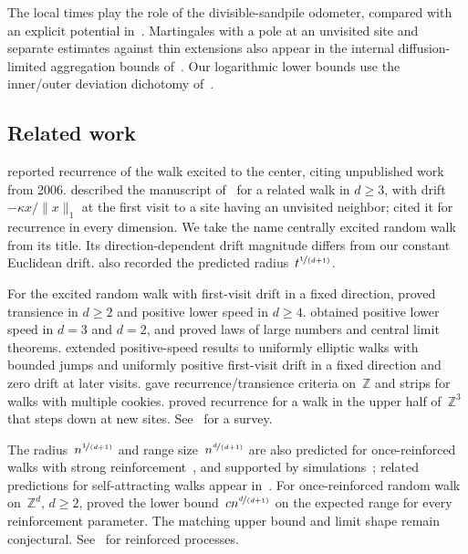 \documentclass[11pt]{amsart}
\theoremstyle{plain}
\theoremstyle{definition}
\newcommand{\Z}{\mathbb Z}
\newcommand{\drift}{\kappa}
\newcommand{\nf}{\nicefrac}
\numberwithin{equation}{section}
\begin{document}
The local times play the role of the divisible-sandpile odometer, compared with an explicit potential in~\citet{LevinePeres2009}. Martingales with a pole at an unvisited site and separate estimates against thin extensions also appear in the internal diffusion-limited aggregation bounds of~\citet*{JerisonLevineSheffield2012,JerisonLevineSheffield2013}. Our logarithmic lower bounds use the inner/outer deviation dichotomy of~\citet[Proposition~1.2]{AsselahGaudilliere2014}.

\subsection{Related work}\label{sec:related}

\citet{Kozma2013} reported recurrence of the walk excited to the center, citing unpublished work from 2006. \citet*{DemboHuangSidoravicius2014} described the manuscript of~\citet{Kozma2006CentrallyExcited} for a related walk in $d\geq3$, with drift~$-\drift x/\|x\|_1$ at the first visit to a site having an unvisited neighbor; \citet*{DemboHuangSidoravicius2014Growing} cited it for recurrence in every dimension. We take the name centrally excited random walk from its title. Its direction-dependent drift magnitude differs from our constant Euclidean drift. \citet*{BenjaminiDuminilCopinKozmaLucas2020} also recorded the predicted radius~$t^{\nf{1}{(d+1)}}$.

For the excited random walk with first-visit drift in a fixed direction, \citet*{BenjaminiWilson2003} proved transience in $d\geq2$ and positive lower speed in $d\geq4$. \citet{Kozma2003Speed,Kozma2005Speed} obtained positive lower speed in $d=3$ and $d=2$, and \citet{BerardRamirez2007} proved laws of large numbers and central limit theorems. \citet*{MenshikovPopovRamirezVachkovskaia2012} extended positive-speed results to uniformly elliptic walks with bounded jumps and uniformly positive first-visit drift in a fixed direction and zero drift at later visits. \citet{Zerner2005,Zerner2006} gave recurrence/transience criteria on~$\Z$ and strips for walks with multiple cookies. \citet*{AmirBenjaminiKozma2008} proved recurrence for a walk in the upper half of~$\Z^3$ that steps down at new sites. See~\citet{KosyginaZerner2013} for a survey.

The radius~$n^{\nf{1}{(d+1)}}$ and range size~$n^{\nf{d}{(d+1)}}$ are also predicted for once-reinforced walks with strong reinforcement~\citep{Beffara2011,ElboimKozma2026}, and supported by simulations~\citep{FosterGrassbergerPaczuski2009}; related predictions for self-attracting walks appear in~\citet{OrdemannBerkolaikoHavlinBunde2000,OrdemannEtAl2001}. For once-reinforced random walk on~$\Z^d$, $d\geq2$, \citet{BouRabeePeres2026ORRW} proved the lower bound~$cn^{\nf{d}{(d+1)}}$ on the expected range for every reinforcement parameter. The matching upper bound and limit shape remain conjectural. See~\citet{Pemantle2007} for reinforced processes.
\end{document}
